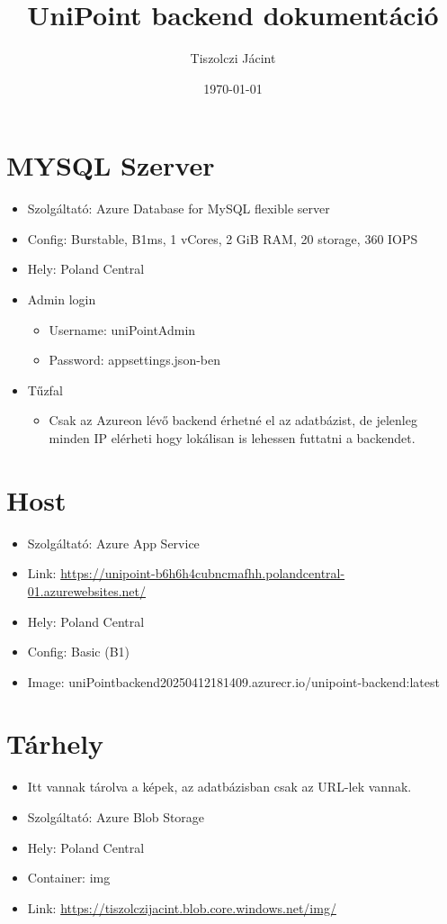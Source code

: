 \documentclass[11pt]{article}
\author{Tiszolczi Jácint}
\date{\today}
\title{UniPoint backend dokumentáció}
\begin{document}
\maketitle
\tableofcontents

\section{MYSQL Szerver}
\label{sec:org5446a91}
\begin{itemize}
\item Szolgáltató: Azure Database for MySQL flexible server
\item Config: Burstable, B1ms, 1 vCores, 2 GiB RAM, 20 storage, 360 IOPS
\item Hely: Poland Central
\item Admin login
\begin{itemize}
\item Username: uniPointAdmin
\item Password: appsettings.json-ben
\end{itemize}
\item Tűzfal
\begin{itemize}
\item Csak az Azureon lévő backend érhetné el az adatbázist, de jelenleg minden IP elérheti hogy lokálisan is lehessen futtatni a backendet.
\end{itemize}
\end{itemize}
\section{Host}
\label{sec:org14a33b0}
\begin{itemize}
\item Szolgáltató: Azure App Service
\item Link: \url{https://unipoint-b6h6h4cubncmafhh.polandcentral-01.azurewebsites.net/}
\item Hely: Poland Central
\item Config: Basic (B1)
\item Image: uniPointbackend20250412181409.azurecr.io/unipoint-backend:latest
\end{itemize}
\section{Tárhely}
\label{sec:org11c6a2e}
\begin{itemize}
\item Itt vannak tárolva a képek, az adatbázisban csak az URL-lek vannak.
\item Szolgáltató: Azure Blob Storage
\item Hely: Poland Central
\item Container: img
\item Link: \url{https://tiszolczijacint.blob.core.windows.net/img/}
\end{itemize}
\end{document}
